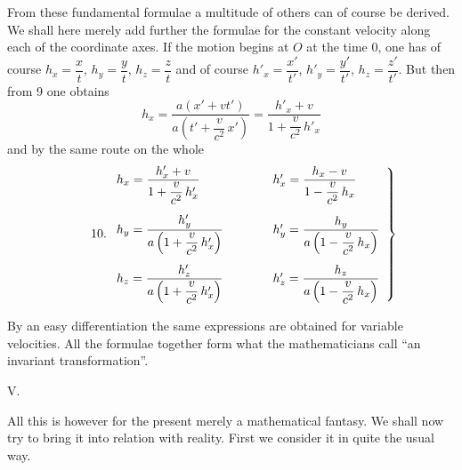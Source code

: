 \documentclass[12pt,a4paper]{article}
\begin{document}
From these fundamental formulae a multitude of others can of course be
derived. We shall here merely add further the formulae for the constant
velocity along each of the coordinate axes. If the motion begins at $O$ at the
time 0, one has of course $h_{x} = \dfrac{x}{t}$, $h_{y} = \dfrac{y}{t}$,
$h_{z} = \dfrac{z}{t}$ and of course $h'_{x} = \dfrac{x'}{t'}$,
$h'_{y} = \dfrac{y'}{t'}$, $h_{z} = \dfrac{z'}{t'}$. But then from 9 one
obtains
\[
  h_{x} = \frac{a(x' + vt')}{a\left(t' + \dfrac{v}{c^{2}}\,x'\right)}
        = \frac{h'_{x} + v}{1 + \dfrac{v}{c^{2}}\,h'_{x}}
\]
and by the same route on the whole
\begin{equation}\tag*{10.}
  \left.
  \begin{array}{l@{\qquad\qquad}l}
    h_{x} = \dfrac{h'_{x} + v}{1 + \dfrac{v}{c^{2}}\,h'_{x}}
      & h'_{x} = \dfrac{h_{x} - v}{1 - \dfrac{v}{c^{2}}\,h_{x}}\\[5ex]
    h_{y} = \dfrac{h'_{y}}{a\left(1 + \dfrac{v}{c^{2}}\,h'_{x}\right)}
      & h'_{y} = \dfrac{h_{y}}{a\left(1 - \dfrac{v}{c^{2}}\,h_{x}\right)}\\[5ex]
    h_{z} = \dfrac{h'_{z}}{a\left(1 + \dfrac{v}{c^{2}}\,h'_{x}\right)}
      & h'_{z} = \dfrac{h_{z}}{a\left(1 - \dfrac{v}{c^{2}}\,h_{x}\right)}
  \end{array}
  \right\}
\end{equation}

By an easy differentiation the same expressions are obtained for variable
velocities. All the formulae together form what the mathematicians call
``an invariant transformation''.

\begin{center}
V.
\end{center}

All this is however for the present merely a mathematical fantasy. We shall
now try to bring it into relation with reality. First we consider it in quite
the usual way.
\end{document}
